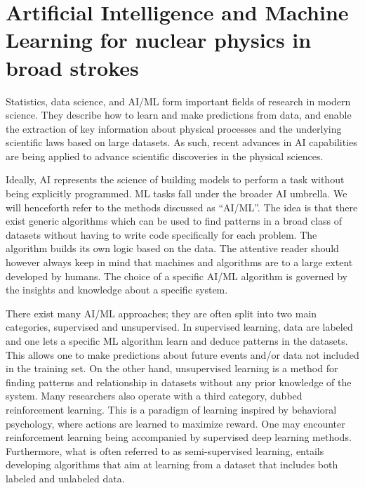 \documentclass[aps,rmp,reprint,amsmath,amssymb,graphicx,longbibliography]{revtex4-2}
\begin{document}
\section{Artificial Intelligence and Machine Learning for nuclear physics in broad strokes}


 Statistics, data science, and AI/ML form important fields of research
 in modern science. They describe how to learn and make predictions
 from data, and enable the extraction of key information about
 physical processes and the underlying scientific laws based on large
 datasets. As such, recent advances in AI capabilities are being
 applied to advance scientific discoveries in the physical sciences.




Ideally, AI represents the science of building models to perform a
task without being explicitly programmed. ML tasks fall under the
broader AI umbrella. We will henceforth refer to the methods discussed
as ``AI/ML''. The idea is that there exist generic algorithms which
can be used to find patterns in a broad class of datasets without
having to write code specifically for each problem. The algorithm
builds its own logic based on the data. The attentive reader should
however always keep in mind that machines and algorithms are to a
large extent developed by humans. The choice of a specific AI/ML
algorithm is governed by the insights and knowledge about a specific
system.



There exist many AI/ML approaches; they are often split into two main
categories, supervised and unsupervised. In supervised learning, data
are labeled and one lets a specific ML algorithm learn and deduce
patterns in the datasets. This allows one to make predictions about
future events and/or data not included in the training set.  On the
other hand, unsupervised learning is a method for finding patterns and
relationship in datasets without any prior knowledge of the
system. Many researchers also operate with a third category, dubbed
reinforcement learning. This is a paradigm of learning inspired by
behavioral psychology, where actions are learned to maximize reward.
One may encounter reinforcement learning being accompanied by
supervised deep learning methods. Furthermore, what is often referred
to as semi-supervised learning, entails developing algorithms that aim
at learning from a dataset that includes both labeled and unlabeled
data.
\end{document}
